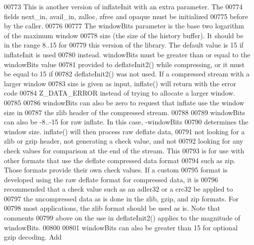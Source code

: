 \begin{DoxyCode}
00773 \textcolor{comment}{     This is another version of inflateInit with an extra parameter.  The}
00774 \textcolor{comment}{   fields next\_in, avail\_in, zalloc, zfree and opaque must be initialized}
00775 \textcolor{comment}{   before by the caller.}
00776 \textcolor{comment}{}
00777 \textcolor{comment}{     The windowBits parameter is the base two logarithm of the maximum window}
00778 \textcolor{comment}{   size (the size of the history buffer).  It should be in the range 8..15 for}
00779 \textcolor{comment}{   this version of the library.  The default value is 15 if inflateInit is used}
00780 \textcolor{comment}{   instead.  windowBits must be greater than or equal to the windowBits value}
00781 \textcolor{comment}{   provided to deflateInit2() while compressing, or it must be equal to 15 if}
00782 \textcolor{comment}{   deflateInit2() was not used.  If a compressed stream with a larger window}
00783 \textcolor{comment}{   size is given as input, inflate() will return with the error code}
00784 \textcolor{comment}{   Z\_DATA\_ERROR instead of trying to allocate a larger window.}
00785 \textcolor{comment}{}
00786 \textcolor{comment}{     windowBits can also be zero to request that inflate use the window size in}
00787 \textcolor{comment}{   the zlib header of the compressed stream.}
00788 \textcolor{comment}{}
00789 \textcolor{comment}{     windowBits can also be -8..-15 for raw inflate.  In this case, -windowBits}
00790 \textcolor{comment}{   determines the window size.  inflate() will then process raw deflate data,}
00791 \textcolor{comment}{   not looking for a zlib or gzip header, not generating a check value, and not}
00792 \textcolor{comment}{   looking for any check values for comparison at the end of the stream.  This}
00793 \textcolor{comment}{   is for use with other formats that use the deflate compressed data format}
00794 \textcolor{comment}{   such as zip.  Those formats provide their own check values.  If a custom}
00795 \textcolor{comment}{   format is developed using the raw deflate format for compressed data, it is}
00796 \textcolor{comment}{   recommended that a check value such as an adler32 or a crc32 be applied to}
00797 \textcolor{comment}{   the uncompressed data as is done in the zlib, gzip, and zip formats.  For}
00798 \textcolor{comment}{   most applications, the zlib format should be used as is.  Note that comments}
00799 \textcolor{comment}{   above on the use in deflateInit2() applies to the magnitude of windowBits.}
00800 \textcolor{comment}{}
00801 \textcolor{comment}{     windowBits can also be greater than 15 for optional gzip decoding.  Add}

\end{DoxyCode}
